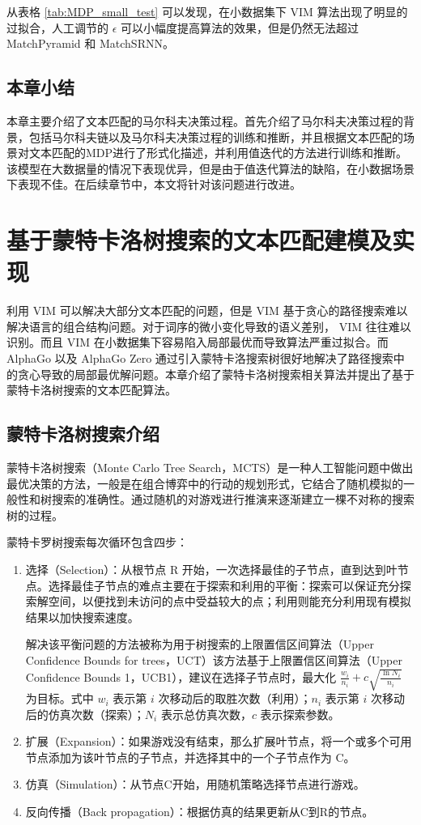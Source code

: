 从表格 \ref{tab:MDP_small_test} 可以发现，在小数据集下 VIM 算法出现了明显的过拟合，人工调节的 $\epsilon$ 可以小幅度提高算法的效果，但是仍然无法超过 MatchPyramid 和 MatchSRNN。

\section{本章小结}
本章主要介绍了文本匹配的马尔科夫决策过程。首先介绍了马尔科夫决策过程的背景，包括马尔科夫链以及马尔科夫决策过程的训练和推断，并且根据文本匹配的场景对文本匹配的MDP进行了形式化描述，并利用值迭代的方法进行训练和推断。该模型在大数据量的情况下表现优异，但是由于值迭代算法的缺陷，在小数据场景下表现不佳。在后续章节中，本文将针对该问题进行改进。

\chapter{基于蒙特卡洛树搜索的文本匹配建模及实现}
\label{chap:Zero}

利用 VIM 可以解决大部分文本匹配的问题，但是 VIM 基于贪心的路径搜索难以解决语言的组合结构问题。对于词序的微小变化导致的语义差别， VIM 往往难以识别。而且 VIM 在小数据集下容易陷入局部最优而导致算法严重过拟合。而 AlphaGo 以及 AlphaGo Zero 通过引入蒙特卡洛搜索树很好地解决了路径搜索中的贪心导致的局部最优解问题。本章介绍了蒙特卡洛树搜索相关算法并提出了基于蒙特卡洛树搜索的文本匹配算法。

\section{蒙特卡洛树搜索介绍}
\label{sec:MCTS_intro}
蒙特卡洛树搜索\cite{Coulom2006EfficientSA}（Monte Carlo Tree Search，MCTS）是一种人工智能问题中做出最优决策的方法，一般是在组合博弈中的行动的规划形式，它结合了随机模拟的一般性和树搜索的准确性。通过随机的对游戏进行推演来逐渐建立一棵不对称的搜索树的过程。

蒙特卡罗树搜索每次循环包含四步：
\begin{enumerate}
	\item 选择（Selection）：从根节点 R 开始，一次选择最佳的子节点，直到达到叶节点。选择最佳子节点的难点主要在于探索和利用的平衡：探索可以保证充分探索解空间，以便找到未访问的点中受益较大的点；利用则能充分利用现有模拟结果以加快搜索速度。

	解决该平衡问题的方法被称为用于树搜索的上限置信区间算法\cite{Kocsis2006BanditBM}（Upper Confidence Bounds for trees，UCT）该方法基于上限置信区间算法\cite{Auer2002FinitetimeAO}（Upper Confidence Bounds 1，UCB1），建议在选择子节点时，最大化 $\frac{w_i}{n_i} +c\sqrt{\frac{\ln N_i}{n_i}}$ 为目标。式中 $w_i$ 表示第 $i$ 次移动后的取胜次数（利用）；$n_i$ 表示第 $i$ 次移动后的仿真次数（探索）；$N_i$ 表示总仿真次数，$c$ 表示探索参数。

	\item 扩展（Expansion）：如果游戏没有结束，那么扩展叶节点，将一个或多个可用节点添加为该叶节点的子节点，并选择其中的一个子节点作为 C。

	\item 仿真（Simulation）：从节点C开始，用随机策略选择节点进行游戏。
	\item 反向传播（Back propagation）：根据仿真的结果更新从C到R的节点。
\end{enumerate}

